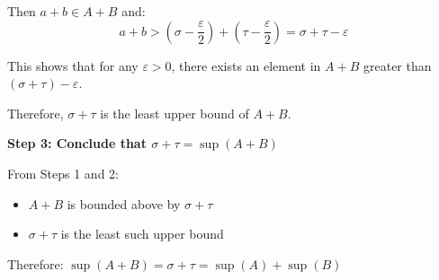 \documentclass[12pt,a4paper]{article}
\theoremstyle{definition}
\theoremstyle{remark}
\begin{document}
Then $a + b \in A + B$ and:
$$a + b > \left(\sigma - \frac{\varepsilon}{2}\right) + \left(\tau - \frac{\varepsilon}{2}\right) = \sigma + \tau - \varepsilon$$

This shows that for any $\varepsilon > 0$, there exists an element in $A + B$ greater than $(\sigma + \tau) - \varepsilon$.

Therefore, $\sigma + \tau$ is the least upper bound of $A + B$.

\textbf{Step 3: Conclude that $\sigma + \tau = \sup(A + B)$}

From Steps 1 and 2:
\begin{itemize}
\item $A + B$ is bounded above by $\sigma + \tau$
\item $\sigma + \tau$ is the least such upper bound
\end{itemize}

Therefore: $\sup(A + B) = \sigma + \tau = \sup(A) + \sup(B)$
\end{document}
